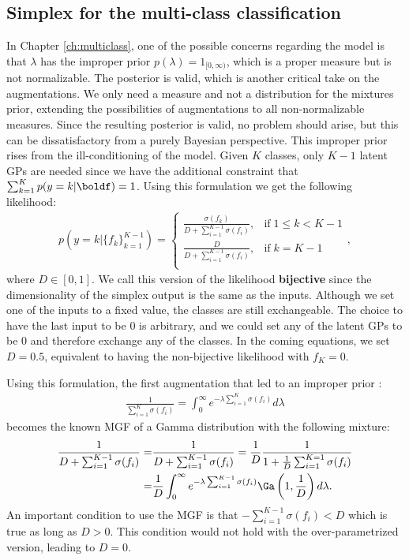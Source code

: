 \subsection{Simplex for the multi-class classification}
\label{sec:simplex}
In Chapter \ref{ch:multiclass}, one of the possible concerns regarding the model is that $\lambda$ has the improper prior $p(\lambda) = 1_{[0,\infty)}$, which is a proper measure but is not normalizable.
The posterior is valid, which is another critical take on the augmentations.
We only need a measure and not a distribution for the mixtures prior, 
extending the possibilities of augmentations to all non-normalizable measures.
Since the resulting posterior is valid, no problem should arise, but this can be dissatisfactory from a purely Bayesian perspective.
This improper prior rises from the ill-conditioning of the model.
Given $K$ classes, only $K-1$ latent \ac{GPs} are needed since we have the additional constraint that $\sum_{k=1}^K p(y=k|\boldf) = 1$.
Using this formulation we get the following likelihood:
\begin{align}
    p(y=k|\{f_k\}_{k=1}^{K-1}) = \left\{
        \begin{array}{cc}
            \frac{\sigma(f_k)}{D + \sum_{i=1}^{K-1}\sigma(f_i)}, & \mathrm{if}\; 1 \leq k < K - 1\\
            \frac{D}{D + \sum_{i=1}^{K-1}\sigma(f_i)}, & \mathrm{if}\; k = K - 1 \\
    \end{array}
    \right.,
\end{align}
where $D \in [0, 1]$.
We call this version of the likelihood \textbf{bijective} since the dimensionality of the simplex output is the same as the inputs.
Although we set one of the inputs to a fixed value, the classes are still exchangeable.
The choice to have the last input to be $0$ is arbitrary, and we could set any of the latent \ac{GPs} to be $0$ and therefore exchange any of the classes.
In the coming equations, we set $D=0.5$, equivalent to having the non-bijective likelihood with $f_K = 0$.

Using this formulation, the first augmentation that led to an improper prior :
\begin{align*}
    \frac{1}{ \sum_{i=1}^{K} \sigma(f_i)} = \int_0^\infty e^{-\lambda  \sum_{i=1}^{K} \sigma(f_i)}d\lambda
\end{align*}
becomes the known \ac{MGF} of a Gamma distribution with the following mixture:
\begin{align*}
    \frac{1}{D + \sum_{i=1}^{K-1} \sigma(f_i)} =& \frac{1}{D + \sum_{i=1}^{K-1} \sigma(f_i)} = \frac{1}{D}\frac{1}{1+\frac{1}{D}\sum_{i=1}^{K=1}\sigma(f_i)}\\
    =& \frac{1}{D}\int_0^\infty e^{-\lambda \sum_{i=1}^{K-1} \sigma(f_i)}\Ga \left(1, \frac{1}{D}\right)d\lambda.
\end{align*}
An important condition to use the \ac{MGF} is that $-\sum_{i=1}^{K-1} \sigma(f_i) < D$ which is true as long as $D > 0$.
This condition would not hold with the over-parametrized version, leading to $D=0$.

